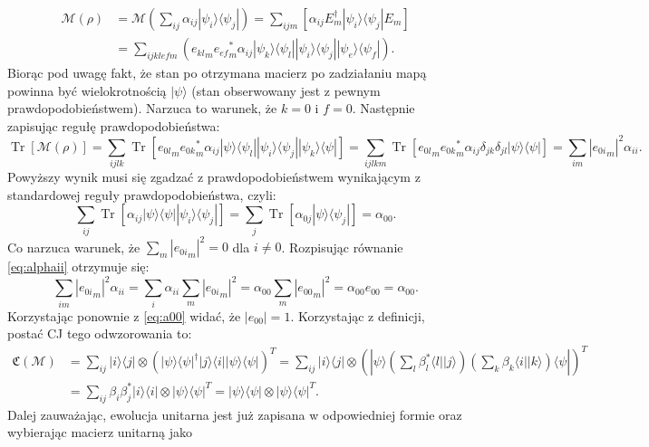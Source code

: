 \documentclass[10pt]{article} %
\DeclareMathOperator{\Trs}{Tr}
\newcommand{\Ket}[1]{|#1\rangle}
\newcommand{\Bra}[1]{\langle#1|}
\newcommand{\KP}{\Ket{\psi}}
\newcommand{\BP}{\Bra{\psi}}
\newcommand{\MCJ}{\mathfrak{C}}
\begin{document}
\begin{equation}
\begin{split}
\mathcal{M}(\rho) &= \mathcal{M}\left(\sum_{ij} \alpha_{ij} \Ket{\psi_i}\Bra{\psi_j}\right) = \sum_{ijm} \left[ \alpha_{ij} E^\dag_m \Ket{\psi_i}\Bra{\psi_j}E_m\right]\\
&= \sum_{ijklefm} \left( {e_{kl}}_m {e_{ef}}_m^*\alpha_{ij} \Ket{\psi_k}\Bra{\psi_l} \Ket{\psi_i}\Bra{\psi_j} \Ket{\psi_e}\Bra{\psi_f}\right). 
\end{split}
\end{equation}
Biorąc pod uwagę fakt, że stan po otrzymana macierz po zadziałaniu mapą powinna być wielokrotnością $\Ket{\psi}$ (stan obserwowany jest z pewnym prawdopodobieństwem). Narzuca to warunek, że $k = 0$ i $f = 0$. Następnie zapisując regułę prawdopodobieństwa:
\begin{equation}
\label{eq:alphaii}
\Trs\left[ \mathcal{M}(\rho) \right] = \sum_{ijlk} \Trs \left[ {e_{0l}}_m{e_{0k}}_m^*\alpha_{ij} \Ket{\psi}\Bra{\psi_l} \Ket{\psi_i}\Bra{\psi_j} \Ket{\psi_k}\Bra{\psi}\right] =
\sum_{ijlkm} \Trs \left [ {e_{0l}}_m{e_{0k}}_m^*\alpha_{ij}\delta_{jk}\delta_{jl} \Ket{\psi}\Bra{\psi} \right] = \sum_{im} |{e_{0i}}_m|^2 \alpha_{ii}.
\end{equation} 
Powyższy wynik musi się zgadzać z prawdopodobieństwem wynikającym z standardowej reguły prawdopodobieństwa, czyli:
\begin{equation}
\label{eq:a00}
\sum_{ij} \Trs \left[ \alpha_{ij} \Ket{\psi}\Bra{\psi} \Ket{\psi_i}\Bra{\psi_j}\right] = \sum_{j} \Trs \left[ \alpha_{0j} \Ket{\psi}\Bra{\psi_j} \right] = \alpha_{00}.
\end{equation}
Co narzuca warunek, że $\sum_m |{e_{0i}}_m|^2 = 0$  dla $i \neq 0$. Rozpisując równanie \eqref{eq:alphaii} otrzymuje się:
\begin{equation}
\sum_{im} |{e_{0i}}_m|^2 \alpha_{ii} = \sum_i \alpha_{ii} \sum_m  |{e_{0i}}_m|^2 = \alpha_{00} \sum_m |{e_{00}}_m|^2 = \alpha_{00} e_{00} = \alpha_{00}.
\end{equation}
Korzystając ponownie z \eqref{eq:a00} widać, że $|e_{00}| = 1$.
Korzystając z definicji, postać CJ tego odwzorowania to:
\begin{equation}
\begin{split}
\MCJ(\mathcal{M}) &= \sum_{ij} \Ket{i}\Bra{j} \otimes (\Ket{\psi}\Bra{\psi}^\dag \Ket{j}\Bra{i} \Ket{\psi}\Bra{\psi})^T = \sum_{ij}\Ket{i}\Bra{j}  \otimes (\Ket{\psi}\left(\sum_l \beta_{l}^* \Bra{l}\Ket{j}\right)\left(\sum_k\beta_k\Bra{i}\Ket{k}\right)\Bra{\psi})^T \\&=  \sum_{ij} \beta_i \beta_j^* \Ket{i}\Bra{i} \otimes \KP\BP^T = \KP\BP \otimes \KP\BP^T.
\end{split}
\end{equation} Dalej zauważając, ewolucja unitarna jest już zapisana w odpowiedniej formie oraz wybierając macierz unitarną jako
\end{document}

